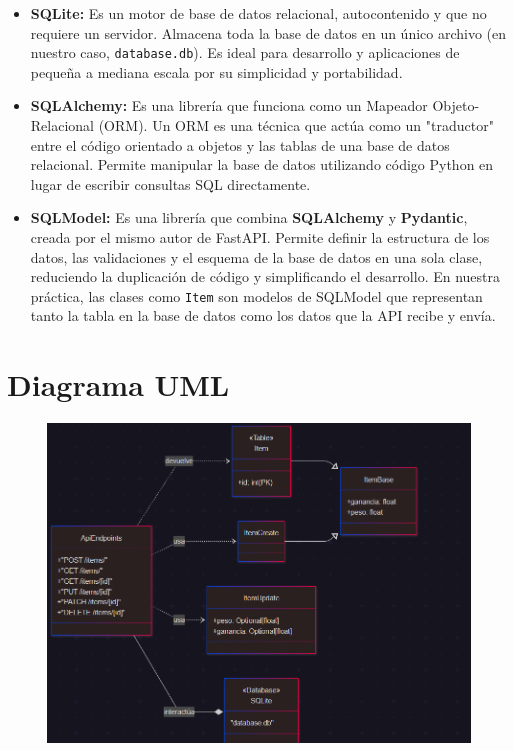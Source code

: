 \documentclass[12pt]{article}
\begin{document}
\begin{itemize}
    \item \textbf{SQLite:} Es un motor de base de datos relacional, autocontenido y que no requiere un servidor. Almacena toda la base de datos en un único archivo (en nuestro caso, \texttt{database.db}). Es ideal para desarrollo y aplicaciones de pequeña a mediana escala por su simplicidad y portabilidad.
    
    \item \textbf{SQLAlchemy:} Es una librería que funciona como un Mapeador Objeto-Relacional (ORM). Un ORM es una técnica que actúa como un "traductor" entre el código orientado a objetos y las tablas de una base de datos relacional. Permite manipular la base de datos utilizando código Python en lugar de escribir consultas SQL directamente.
    
    \item \textbf{SQLModel:} Es una librería que combina \textbf{SQLAlchemy} y \textbf{Pydantic}, creada por el mismo autor de FastAPI. Permite definir la estructura de los datos, las validaciones y el esquema de la base de datos en una sola clase, reduciendo la duplicación de código y simplificando el desarrollo. En nuestra práctica, las clases como \texttt{Item} son modelos de SQLModel que representan tanto la tabla en la base de datos como los datos que la API recibe y envía.\cite{ref4}
\end{itemize}

\section{Diagrama UML}
\begin{figure}[H]
    \centering
    \includegraphics[width=1\textwidth]{Imagenes/Diagrama.png}
\end{figure}
\end{document}
